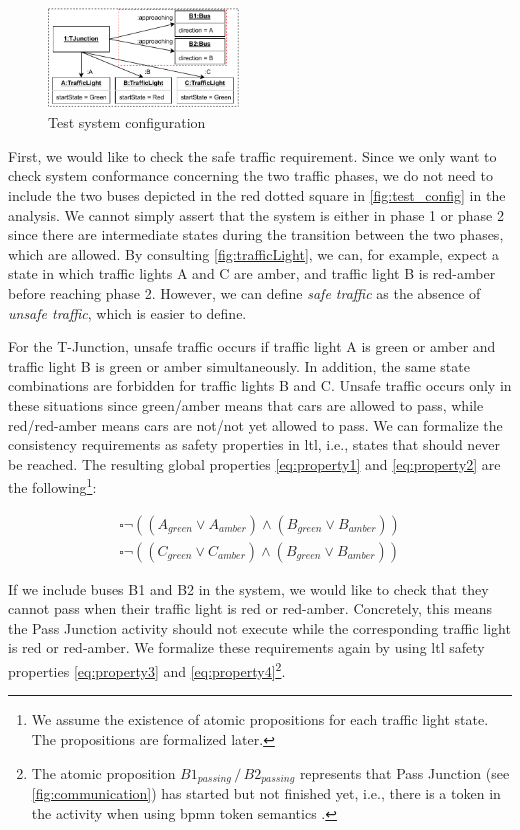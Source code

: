 \documentclass{jot}
\begin{document}
\begin{figure}[h]
    \centering
    \includegraphics[width=0.45\textwidth]{figures/test_config.pdf}
    \caption{Test system configuration}
    \label{fig:test_config}
\end{figure}

First, we would like to check the safe traffic requirement.
Since we only want to check system conformance concerning the two traffic phases, we do not need to include the two buses depicted in the red dotted square in \autoref{fig:test_config} in the analysis.
We cannot simply assert that the system is either in phase 1 or phase 2 since there are intermediate states during the transition between the two phases, which are allowed.
By consulting \autoref{fig:trafficLight}, we can, for example, expect a state in which traffic lights A and C are amber, and traffic light B is red-amber before reaching phase 2.
However, we can define \emph{safe traffic} as the absence of \emph{unsafe traffic}, which is easier to define.

For the T-Junction, unsafe traffic occurs if traffic light A is green or amber and traffic light B is green or amber simultaneously.
In addition, the same state combinations are forbidden for traffic lights B and C.
Unsafe traffic occurs only in these situations since green/amber means that cars are allowed to pass, while red/red-amber means cars are not/not yet allowed to pass.
We can formalize the consistency requirements as safety properties in \gls*{ltl}, i.e., states that should never be reached.
The resulting global properties \ref{eq:property1} and \ref{eq:property2} are the following\footnote{We assume the existence of atomic propositions for each traffic light state. 
The propositions are formalized later.}:

\begin{align}
    \square\neg((A_{green} \lor A_{amber}) \land (B_{green} \lor B_{amber})) \label{eq:property1} \\
    \square\neg((C_{green} \lor C_{amber}) \land (B_{green} \lor B_{amber})) \label{eq:property2}
\end{align}

If we include buses \textsf{B1} and \textsf{B2} in the system, we would like to check that they cannot pass when their traffic light is red or red-amber.
Concretely, this means the \textsf{Pass Junction} activity should not execute while the corresponding traffic light is \textsf{red} or \textsf{red-amber}.
We formalize these requirements again by using \gls*{ltl} safety properties \ref{eq:property3} and \ref{eq:property4}\footnote{The atomic proposition $B1_{passing}\, / \,B2_{passing}$ represents that \textsf{Pass Junction} (see \autoref{fig:communication}) has started but not finished yet, i.e., there is a token in the activity when using \gls*{bpmn} token semantics \cite{objectmanagementgroupBusinessProcessModel2013}.}.
\end{document}
